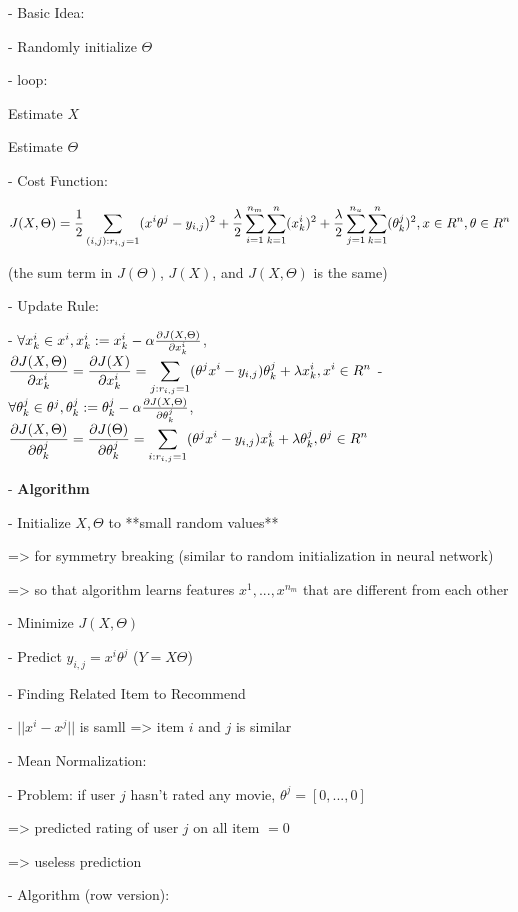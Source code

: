 - Basic Idea: 

- Randomly initialize $\Theta$ 

- loop:

	Estimate $X$ 

	Estimate $\Theta$ 

- Cost Function: 

$\displaystyle J(X,\Theta) = \frac 1 2 \sum_{(i,j):r_{i,j}=1}(x^i\theta^j - y_{i,j})^2 + \frac \lambda 2 \sum_{i=1}^{n_m}\sum_{k=1}^n(x_k^i)^2 + \frac \lambda 2 \sum_{j=1}^{n_u}\sum_{k=1}^n (\theta_k^j)^2, \space x \in R^n, \space \theta \in R^n$ 

(the sum term in $J(\Theta)$, $J(X)$, and $J(X,\Theta)$ is the same)

- Update Rule: 

- $\forall x^i_k \in x^i, x^i_k := x^i_k-\alpha\large\frac{\partial J(X,\Theta)}{\partial x^i_k}$, $\displaystyle \frac{\partial J(X,\Theta)}{\partial x^i_k} = \frac{\partial J(X)}{\partial x^i_k} =\sum_{j:r_{i,j}=1}(\theta^jx^i-y_{i,j})\theta_k^j+ \lambda x_k^i, \space x^i \in R^n$ 
- $\forall \theta^j_k \in \theta^j, \theta^j_k := \theta^j_k-\alpha\large\frac{\partial J(X,\Theta)}{\partial\theta^j_k}$, $\displaystyle \frac{\partial J(X,\Theta)}{\partial\theta^j_k} = \frac{\partial J(\Theta)}{\partial\theta^j_k} = \sum_{i:r_{i,j}=1}(\theta^jx^i-y_{i,j})x_k^i+ \lambda \theta_k^j, \space \theta^j \in R^n$ 

- \textbf{Algorithm}

- Initialize $X, \Theta$ to **small random values**

=> for symmetry breaking (similar to random initialization in neural network) 

=> so that algorithm learns features $x^1,...,x^{n_m}$ that are different from each other

- Minimize $J(X,\Theta)$ 

- Predict $y_{i,j} = x^i\theta^j$ ($Y = X\Theta$)

- Finding Related Item to Recommend

- $||x^i-x^j||$ is samll => item $i$ and $j$ is similar

- Mean Normalization:

- Problem: if user $j$ hasn't rated any movie, $\theta^j = [0,...,0]$  

=> predicted rating of user $j$ on all item $=0$ 

=> useless prediction

- Algorithm (row version):

